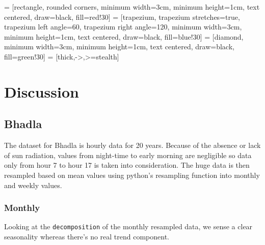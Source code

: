 \documentclass[a4paper,12pt]{article}
\begin{document}
\usetikzlibrary{shapes.geometric, arrows}
 = [rectangle, rounded corners,
minimum width=3cm,
minimum height=1cm,
text centered,
draw=black,
fill=red!30]
 = [trapezium,
trapezium stretches=true, %
trapezium left angle=60,
trapezium right angle=120,
minimum width=3cm,
minimum height=1cm, text centered,
draw=black, fill=blue!30]
 = [diamond,
minimum width=3cm,
minimum height=1cm,
text centered,
draw=black,
fill=green!30]
 = [thick,->,>=stealth]

\pagebreak
\section{Discussion}
\label{sec:org16075b7}
\subsection{Bhadla}
\label{sec:orgb0cb52d}
The dataset for Bhadla is hourly data for 20 years. Because of the absence or lack of sun radiation, values from night-time to early morning are negligible so data only from hour 7 to hour 17 is taken into consideration. The huge data is then resampled based on mean values using python's resampling function into monthly and weekly values.
\subsubsection{Monthly}
\label{sec:org56e9f3f}
Looking at the \texttt{decomposition} of the monthly resampled data, we sense a clear seasonality whereas there's no real trend component.
\end{document}

